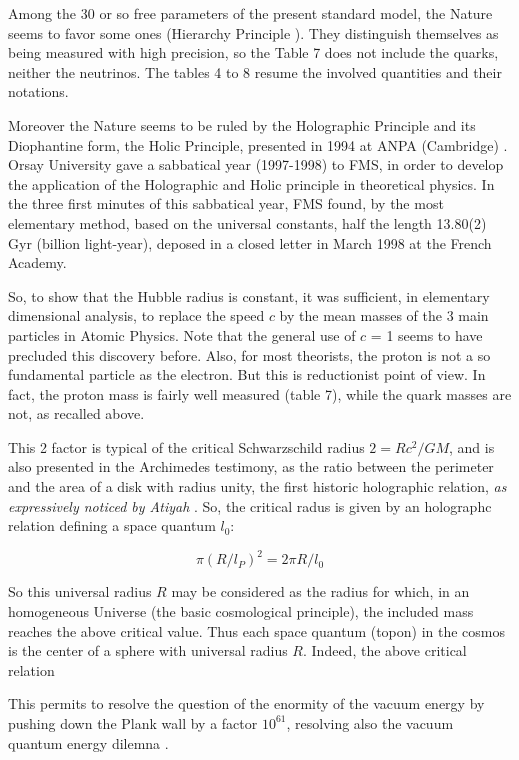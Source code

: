 \documentclass[a4paper,9pt]{article}
\begin{document}
Among the 30 or so free parameters of the present standard model, the Nature seems to favor some ones (Hierarchy Principle \cite{Sanchez}). They distinguish themselves as being measured with high precision, so the Table 7 does not include the quarks, neither the neutrinos. The tables 4 to 8 resume the involved quantities and their notations. 

Moreover the Nature seems to be ruled by the Holographic Principle and its Diophantine form, the Holic Principle, presented in 1994 at ANPA (Cambridge)  \cite{Sanchez1}. Orsay University gave a sabbatical year (1997-1998) to FMS, in order to develop the application of the Holographic and Holic principle in theoretical physics. In the three first minutes of this sabbatical year, FMS found, by the most elementary method, based on the universal constants, half the length 13.80(2) Gyr (billion light-year), deposed in a closed letter in March 1998 at the French Academy. 


So, to show that the Hubble radius is constant, it was sufficient, in elementary dimensional analysis, to replace the speed $c$ by the mean masses of the 3 main particles in Atomic Physics. Note that the general use of $c$ = 1 seems to have precluded this discovery before. Also, for most theorists, the proton is not a so fundamental particle as the electron. But this is reductionist point of view. In fact, the proton mass is fairly well measured (table 7), while the quark masses are not, as recalled above.
 
    This 2 factor is typical of the critical Schwarzschild radius $2 = Rc^2/GM$, and is also presented in the Archimedes testimony, as the ratio between the perimeter and the area of a disk with radius unity, the first historic holographic relation, \textit {as expressively noticed by Atiyah }. So, the critical radus is given by an holographc relation defining a space quantum $l_0$:
    
    \begin{equation}
        \pi (R/l_P)^2 = 2\pi R/l_0
    \end{equation}
    
    So this universal radius $R$ may be considered as the radius for which, in an homogeneous Universe (the basic cosmological principle), the included mass reaches the above critical value\cite{Sanchez}. Thus each space quantum (topon) in the cosmos is the center of a sphere with universal radius $R$. Indeed, the above critical relation  
    
    
    This permits to resolve the question of the enormity of the vacuum energy by pushing down the Plank wall by a factor $10^61$, resolving also the vacuum quantum energy dilemna  \cite{Sanchez} . 
    
\end{document}
